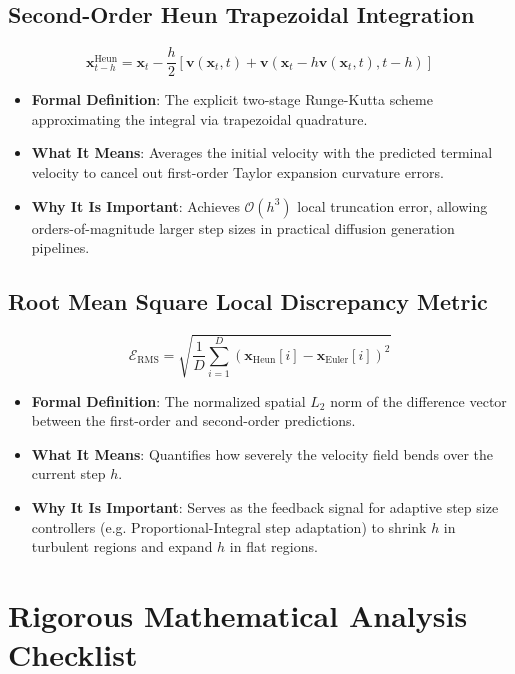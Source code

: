 \documentclass[11pt,a4paper]{article}
\theoremstyle{definition}
\begin{document}
\subsection{Second-Order Heun Trapezoidal Integration}
{\boldmath
\begin{equation}
\mathbf{x}_{t-h}^{\text{Heun}} = \mathbf{x}_t - \frac{h}{2} \left[ \mathbf{v}(\mathbf{x}_t, t) + \mathbf{v}(\mathbf{x}_t - h \mathbf{v}(\mathbf{x}_t, t), t - h) \right]
\end{equation}
}
\begin{itemize}
    \item \textbf{Formal Definition}: The explicit two-stage Runge-Kutta scheme approximating the integral via trapezoidal quadrature.
    \item \textbf{What It Means}: Averages the initial velocity with the predicted terminal velocity to cancel out first-order Taylor expansion curvature errors.
    \item \textbf{Why It Is Important}: Achieves $\mathcal{O}(h^3)$ local truncation error, allowing orders-of-magnitude larger step sizes in practical diffusion generation pipelines.
\end{itemize}

\subsection{Root Mean Square Local Discrepancy Metric}
{\boldmath
\begin{equation}
\mathcal{E}_{\text{RMS}} = \sqrt{\frac{1}{D} \sum_{i=1}^D \left( \mathbf{x}_{\text{Heun}}[i] - \mathbf{x}_{\text{Euler}}[i] \right)^2}
\end{equation}
}
\begin{itemize}
    \item \textbf{Formal Definition}: The normalized spatial $L_2$ norm of the difference vector between the first-order and second-order predictions.
    \item \textbf{What It Means}: Quantifies how severely the velocity field bends over the current step $h$.
    \item \textbf{Why It Is Important}: Serves as the feedback signal for adaptive step size controllers (e.g. Proportional-Integral step adaptation) to shrink $h$ in turbulent regions and expand $h$ in flat regions.
\end{itemize}

\section{Rigorous Mathematical Analysis Checklist}
\end{document}
